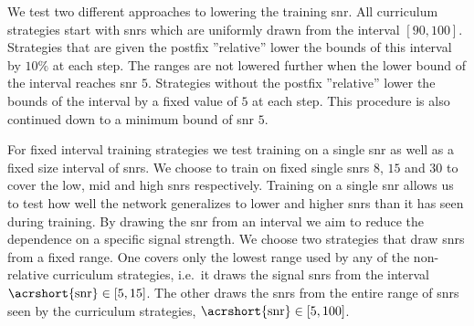 We test two different approaches to lowering the training \acrshort{snr}. All curriculum strategies start with \acrshort{snr}s which are uniformly drawn from the interval $\left[90, 100\right]$. Strategies that are given the postfix ''relative'' lower the bounds of this interval by $10\%$ at each step. The ranges are not lowered further when the lower bound of the interval reaches \acrshort{snr} $5$. Strategies without the postfix ''relative'' lower the bounds of the interval by a fixed value of $5$ at each step. This procedure is also continued down to a minimum bound of \acrshort{snr} $5$.

For fixed interval training strategies we test training on a single \acrshort{snr} as well as a fixed size interval of \acrshort{snr}s. We choose to train on fixed single \acrshort{snr}s $8$, $15$ and $30$ to cover the low, mid and high \acrshort{snr}s respectively. Training on a single \acrshort{snr} allows us to test how well the network generalizes to lower and higher \acrshort{snr}s than it has seen during training. By drawing the \acrshort{snr} from an interval we aim to reduce the dependence on a specific signal strength. We choose two strategies that draw \acrshort{snr}s from a fixed range. One covers only the lowest range used by any of the non-relative curriculum strategies, i.e.\ it draws the signal \acrshort{snr}s from the interval $\text{\acrshort{snr}}\in\left[5,15\right]$. The other draws the \acrshort{snr}s from the entire range of \acrshort{snr}s seen by the curriculum strategies, $\text{\acrshort{snr}}\in\left[5,100\right]$.

